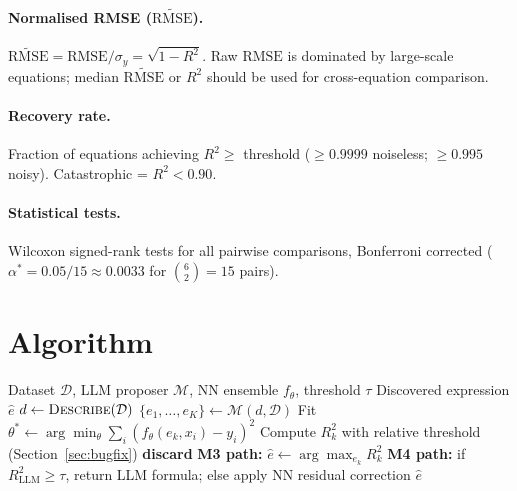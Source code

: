 \documentclass[twoside,11pt]{article}
\newcommand{\Rsq}{R^{2}}
\newcommand{\rmse}{\ensuremath{\mathrm{RMSE}}}
\newcommand{\nrmse}{\ensuremath{\widetilde{\mathrm{RMSE}}}}
\begin{document}
\paragraph{Normalised RMSE ($\nrmse$).}
$\nrmse = \rmse/\sigma_y = \sqrt{1 - \Rsq}$.
Raw \rmse{} is dominated by large-scale equations; median \nrmse{} or $\Rsq$
should be used for cross-equation comparison.

\paragraph{Recovery rate.}
Fraction of equations achieving $\Rsq \geq $ threshold ($\geq 0.9999$
noiseless; $\geq 0.995$ noisy).  Catastrophic = $\Rsq < 0.90$.

\paragraph{Statistical tests.}
Wilcoxon signed-rank tests for all pairwise comparisons, Bonferroni corrected
($\alpha^* = 0.05/15 \approx 0.0033$ for $\binom{6}{2}=15$ pairs).

\section{Algorithm}
\label{sec:algorithm}

\begin{algorithm}[ht]
\caption{HypatiaX hybrid symbolic discovery (M3/M4 core loop)}
\label{alg:hds}
\begin{algorithmic}[1]
\REQUIRE Dataset $\mathcal{D}$, LLM proposer $\mathcal{M}$,
         NN ensemble $f_\theta$, threshold $\tau$
\ENSURE  Discovered expression $\hat{e}$
\STATE $d \leftarrow \textsc{Describe}(\mathcal{D})$
\STATE $\{e_1,\dots,e_K\} \leftarrow \mathcal{M}(d, \mathcal{D})$
  \STATE Fit $\theta^* \leftarrow \arg\min_\theta \sum_i (f_\theta(e_k,x_i)-y_i)^2$
  \STATE Compute $\Rsq_k$ with relative threshold (Section~\ref{sec:bugfix})
    \STATE \textbf{discard}
  \ENDIF
\ENDFOR
\STATE \textbf{M3 path:} $\hat{e} \leftarrow \arg\max_{e_k} \Rsq_k$
\STATE \textbf{M4 path:} if $\Rsq_{\text{LLM}} \geq \tau$, return LLM formula;
       else apply NN residual correction
\RETURN $\hat{e}$
\end{algorithmic}
\end{algorithm}

\end{document}
